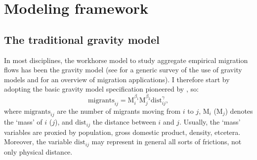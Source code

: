 \documentclass[a4paper,fleqn]{cas-dc}
\begin{document}
\section{Modeling framework}

\subsection{The traditional gravity model}

In most disciplines, the workhorse model to study aggregate empirical migration
flows has been the gravity model (see \citet{anderson2011gravity} for a generic
survey of the use of gravity models and \citet{poot2016gravity} for an overview
of migration applications). I therefore start by adopting the basic gravity
model specification pioneered by \citet{tinbergen1962shaping}, so:
\begin{equation}
  \text{migrants}_{ij} = \text{M}_i^{\beta_1}\text{M}_j^{\beta_2}\text{dist}_{ij}^\gamma,
  \label{eq:grav}
\end{equation}
where $\text{migrants}_{ij}$ are the number of migrants moving from $i$ to $j$,
$\text{M}_i$ ($\text{M}_j$) denotes the `mass' of $i$ ($j$), and
$\text{dist}_{ij}$ the distance between $i$ and $j$. Usually, the `mass'
variables are proxied by population, gross domestic product, density, etcetera.
Moreover, the variable $\text{dist}_{ij}$ may represent in general all sorts of
frictions, not only physical distance.
\end{document}
